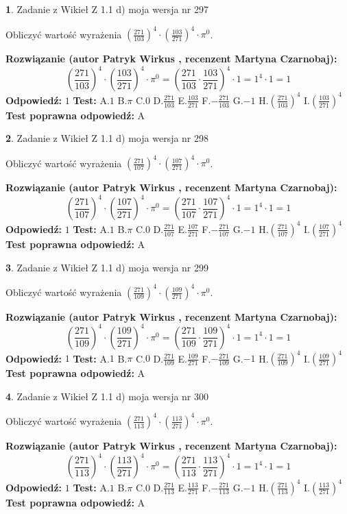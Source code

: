 \documentclass[12pt, a4paper]{article}
\theoremstyle{definition} %
\newtheorem{zad}{}
\newcommand{\zadStart}[1]{\begin{zad}#1\newline}
\newcommand{\zadStop}{\end{zad}}
\newcommand{\rozwStart}[2]{\noindent \textbf{Rozwiązanie (autor #1 , recenzent #2): }\newline}
\newcommand{\rozwStop}{\newline}
\newcommand{\odpStart}{\noindent \textbf{Odpowiedź:}\newline}
\newcommand{\odpStop}{\newline}
\newcommand{\testStart}{\noindent \textbf{Test:}\newline}
\newcommand{\testStop}{\newline}
\newcommand{\kluczStart}{\noindent \textbf{Test poprawna odpowiedź:}\newline}
\newcommand{\kluczStop}{\newline}
\begin{document}
\zadStart{Zadanie z Wikieł Z 1.1 d) moja wersja nr 297}

Obliczyć wartość wyrażenia $(\frac{271}{103})^{4} \cdot (\frac{103}{271})^{4} \cdot \pi^{0}$.
\zadStop
\rozwStart{Patryk Wirkus}{Martyna Czarnobaj}
$$(\frac{271}{103})^{4} \cdot (\frac{103}{271})^{4} \cdot \pi^{0} = (\frac{271}{103} \cdot \frac{103}{271})^{4} \cdot 1 = 1^{4} \cdot 1 = 1$$
\rozwStop
\odpStart
$1$
\odpStop
\testStart
A.$1$ B.$\pi$ C.$0$ D.$\frac{271}{103}$ E.$\frac{103}{271}$
F.$-\frac{271}{103}$ G.$-1$
H.$(\frac{271}{103})^{4}$
I.$(\frac{103}{271})^{4}$
\testStop
\kluczStart
A
\kluczStop



\zadStart{Zadanie z Wikieł Z 1.1 d) moja wersja nr 298}

Obliczyć wartość wyrażenia $(\frac{271}{107})^{4} \cdot (\frac{107}{271})^{4} \cdot \pi^{0}$.
\zadStop
\rozwStart{Patryk Wirkus}{Martyna Czarnobaj}
$$(\frac{271}{107})^{4} \cdot (\frac{107}{271})^{4} \cdot \pi^{0} = (\frac{271}{107} \cdot \frac{107}{271})^{4} \cdot 1 = 1^{4} \cdot 1 = 1$$
\rozwStop
\odpStart
$1$
\odpStop
\testStart
A.$1$ B.$\pi$ C.$0$ D.$\frac{271}{107}$ E.$\frac{107}{271}$
F.$-\frac{271}{107}$ G.$-1$
H.$(\frac{271}{107})^{4}$
I.$(\frac{107}{271})^{4}$
\testStop
\kluczStart
A
\kluczStop



\zadStart{Zadanie z Wikieł Z 1.1 d) moja wersja nr 299}

Obliczyć wartość wyrażenia $(\frac{271}{109})^{4} \cdot (\frac{109}{271})^{4} \cdot \pi^{0}$.
\zadStop
\rozwStart{Patryk Wirkus}{Martyna Czarnobaj}
$$(\frac{271}{109})^{4} \cdot (\frac{109}{271})^{4} \cdot \pi^{0} = (\frac{271}{109} \cdot \frac{109}{271})^{4} \cdot 1 = 1^{4} \cdot 1 = 1$$
\rozwStop
\odpStart
$1$
\odpStop
\testStart
A.$1$ B.$\pi$ C.$0$ D.$\frac{271}{109}$ E.$\frac{109}{271}$
F.$-\frac{271}{109}$ G.$-1$
H.$(\frac{271}{109})^{4}$
I.$(\frac{109}{271})^{4}$
\testStop
\kluczStart
A
\kluczStop



\zadStart{Zadanie z Wikieł Z 1.1 d) moja wersja nr 300}

Obliczyć wartość wyrażenia $(\frac{271}{113})^{4} \cdot (\frac{113}{271})^{4} \cdot \pi^{0}$.
\zadStop
\rozwStart{Patryk Wirkus}{Martyna Czarnobaj}
$$(\frac{271}{113})^{4} \cdot (\frac{113}{271})^{4} \cdot \pi^{0} = (\frac{271}{113} \cdot \frac{113}{271})^{4} \cdot 1 = 1^{4} \cdot 1 = 1$$
\rozwStop
\odpStart
$1$
\odpStop
\testStart
A.$1$ B.$\pi$ C.$0$ D.$\frac{271}{113}$ E.$\frac{113}{271}$
F.$-\frac{271}{113}$ G.$-1$
H.$(\frac{271}{113})^{4}$
I.$(\frac{113}{271})^{4}$
\testStop
\kluczStart
A
\kluczStop
\end{document}
